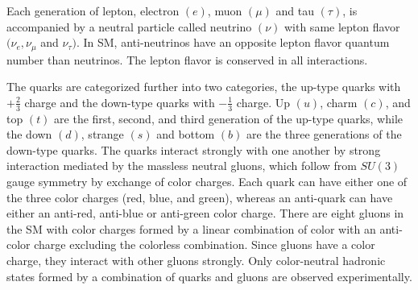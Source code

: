 Each generation of lepton, electron $(e)$, muon $(\mu)$ and tau $(\tau)$, is accompanied by a neutral particle called neutrino $(\nu)$ with same lepton flavor $(\nu_e, \nu_{\mu}$ and $\nu_{\tau})$. In SM, anti-neutrinos have an opposite lepton flavor quantum number than neutrinos. The lepton flavor is conserved in all interactions.

The quarks are categorized further into two categories, the up-type quarks with $+\frac{2}{3}$ charge and the down-type quarks with $-\frac{1}{3}$ charge. Up $(u)$, charm  $(c)$, and top $(t)$ are the first, second, and third generation of the up-type quarks, while the down $(d)$, strange $(s)$ and bottom $(b)$ are the three generations of the down-type quarks. The quarks interact strongly with one another by strong interaction mediated by the massless neutral gluons, which follow from $SU(3)$ gauge symmetry by exchange of color charges. Each quark can have either one of the three color charges (red, blue, and green), whereas an anti-quark can have either an anti-red, anti-blue or anti-green color charge. There are eight gluons in the SM with color charges formed by a linear combination of color with an anti-color charge excluding the colorless combination. Since gluons have a color charge, they interact with other gluons strongly. Only color-neutral hadronic states formed by a combination of quarks and gluons are observed experimentally.

